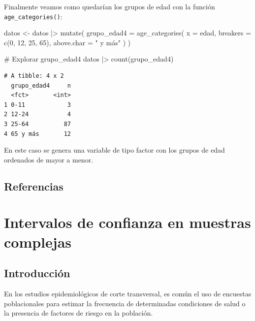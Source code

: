 \documentclass[
  spanish,
  a4paper,
]{scrbook}
\newenvironment{Shaded}{\begin{snugshade}}{\end{snugshade}}
\newcommand{\AttributeTok}[1]{\textcolor[rgb]{0.40,0.45,0.13}{#1}}
\newcommand{\CommentTok}[1]{\textcolor[rgb]{0.37,0.37,0.37}{#1}}
\newcommand{\DecValTok}[1]{\textcolor[rgb]{0.68,0.00,0.00}{#1}}
\newcommand{\FunctionTok}[1]{\textcolor[rgb]{0.28,0.35,0.67}{#1}}
\newcommand{\NormalTok}[1]{\textcolor[rgb]{0.00,0.23,0.31}{#1}}
\newcommand{\OtherTok}[1]{\textcolor[rgb]{0.00,0.23,0.31}{#1}}
\newcommand{\SpecialCharTok}[1]{\textcolor[rgb]{0.37,0.37,0.37}{#1}}
\newcommand{\StringTok}[1]{\textcolor[rgb]{0.13,0.47,0.30}{#1}}
\begin{document}
Finalmente veamos como quedarían los grupos de edad con la función
\texttt{age\_categories()}:

\begin{Shaded}
\begin{Highlighting}[]
\NormalTok{datos }\OtherTok{\textless{}{-}}\NormalTok{ datos }\SpecialCharTok{|\textgreater{}}
  \FunctionTok{mutate}\NormalTok{(}
    \AttributeTok{grupo\_edad4 =} \FunctionTok{age\_categories}\NormalTok{(}
      \AttributeTok{x =}\NormalTok{ edad,}
      \AttributeTok{breakers =} \FunctionTok{c}\NormalTok{(}\DecValTok{0}\NormalTok{, }\DecValTok{12}\NormalTok{, }\DecValTok{25}\NormalTok{, }\DecValTok{65}\NormalTok{),}
      \AttributeTok{above.char =} \StringTok{" y más"}
\NormalTok{    )}
\NormalTok{  )}

\CommentTok{\# Explorar grupo\_edad4}
\NormalTok{datos }\SpecialCharTok{|\textgreater{}}
  \FunctionTok{count}\NormalTok{(grupo\_edad4)}
\end{Highlighting}
\end{Shaded}

\begin{verbatim}
# A tibble: 4 x 2
  grupo_edad4     n
  <fct>       <int>
1 0-11            3
2 12-24           4
3 25-64          87
4 65 y más       12
\end{verbatim}

En este caso se genera una variable de tipo factor con los grupos de
edad ordenados de mayor a menor.

\section*{Referencias}\label{referencias-9}


\chapter{Intervalos de confianza en muestras
complejas}\label{intervalos-de-confianza-en-muestras-complejas}

\section{Introducción}\label{introducciuxf3n-9}

En los estudios epidemiológicos de corte transversal, es común el uso de
encuestas poblacionales para estimar la frecuencia de determinadas
condiciones de salud o la presencia de factores de riesgo en la
población.
\end{document}
